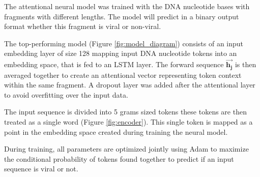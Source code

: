 \documentclass[conference]{IEEEtran}
\begin{document}


The attentional neural model was trained with the DNA nucleotide bases with fragments with different lengths. The model will predict in a binary output format whether this fragment is viral or non-viral.

The top-performing model (Figure \ref{fig:model_diagram}) consists of an input embedding layer of size 128 mapping input DNA nucleotide tokens into an embedding space, that is fed to an LSTM layer. The forward sequence $\mathbf{\overrightarrow{h_{j}}}$ is then averaged together to create an attentional vector representing token context within the same fragment. A dropout layer was added after the attentional layer to avoid overfitting over the input data.


The input sequence is divided into 5 grams sized tokens these tokens are then treated as a single word (Figure \ref{fig:encoder}). This single token is mapped as a point in the embedding space created during training the neural model.

During training, all parameters are optimized jointly using Adam to maximize the conditional probability of tokens found together to predict if an input sequence is viral or not.

\end{document}
